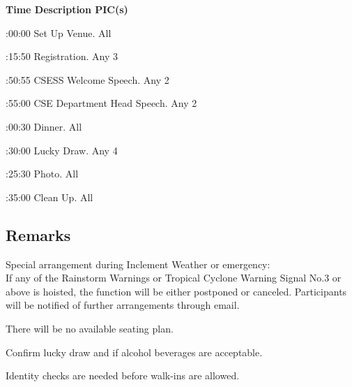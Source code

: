 \bTR\bTH    \bf{Time}
\eTH\bTH    \bf{Description}
\eTH\bTH    \bf{PIC(s)}
\eTH\eTR

\eTABLEhead
\bTABLEbody

\bTR{}:00:00
\eTD\bTD Set Up Venue.
\eTD\bTD All
\eTD\eTR

\bTR{}:15:50
\eTD\bTD Registration.
\eTD\bTD Any 3
\eTD\eTR

\bTR{}:50:55
\eTD\bTD CSESS Welcome Speech.
\eTD\bTD Any 2
\eTD\eTR

\bTR{}:55:00
\eTD\bTD CSE Department Head Speech.
\eTD\bTD Any 2
\eTD\eTR

\bTR{}:00:30
\eTD\bTD Dinner.
\eTD\bTD All
\eTD\eTR

\bTR{}:30:00
\eTD\bTD Lucky Draw.
\eTD\bTD Any 4
\eTD\eTR

\bTR{}:25:30
\eTD\bTD Photo.
\eTD\bTD All
\eTD\eTR

\bTR{}:35:00
\eTD\bTD Clean Up.
\eTD\bTD All
\eTD\eTR

\eTABLEbody
\eTABLE

\subsection{Remarks}
\startitemize
\item Special arrangement during Inclement Weather or emergency: \\
If any of the Rainstorm Warnings or Tropical Cyclone Warning Signal No.3 or above is hoisted, the function will be either postponed or canceled. Participants will be notified of further arrangements through email.
\item There will be no available seating plan.
\item Confirm lucky draw and if alcohol beverages are acceptable.
\item Identity checks are needed before walk-ins are allowed.
\stopitemize

\stopsection
\pagebreak
